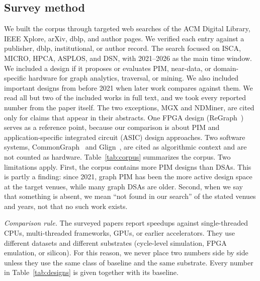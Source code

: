 \documentclass[journal,onecolumn]{IEEEtran}
\begin{document}
\subsection{Survey method}
We built the corpus through targeted web searches of the ACM Digital Library, IEEE Xplore, arXiv, dblp, and author pages. We verified each entry against a publisher, dblp, institutional, or author record. The search focused on ISCA, MICRO, HPCA, ASPLOS, and DSN, with 2021--2026 as the main time window. We included a design if it proposes or evaluates PIM, near-data, or domain-specific hardware for graph analytics, traversal, or mining. We also included important designs from before 2021 when later work compares against them. We read all but two of the included works in full text, and we took every reported number from the paper itself. The two exceptions, MGX and NDMiner, are cited only for claims that appear in their abstracts. One FPGA design (ReGraph~\cite{chen2022regraph}) serves as a reference point, because our comparison is about PIM and application-specific integrated circuit (ASIC) design approaches. Two software systems, CommonGraph~\cite{afarin2023commongraph} and Glign~\cite{yin2023glign}, are cited as algorithmic context and are not counted as hardware. Table~\ref{tab:corpus} summarizes the corpus. Two limitations apply. First, the corpus contains more PIM designs than DSAs. This is partly a finding: since 2021, graph PIM has been the more active design space at the target venues, while many graph DSAs are older. Second, when we say that something is absent, we mean ``not found in our search'' of the stated venues and years, not that no such work exists.

\emph{Comparison rule.} The surveyed papers report speedups against single-threaded CPUs, multi-threaded frameworks, GPUs, or earlier accelerators. They use different datasets and different substrates (cycle-level simulation, FPGA emulation, or silicon). For this reason, we never place two numbers side by side unless they use the same class of baseline and the same substrate. Every number in Table~\ref{tab:designs} is given together with its baseline.
\end{document}
